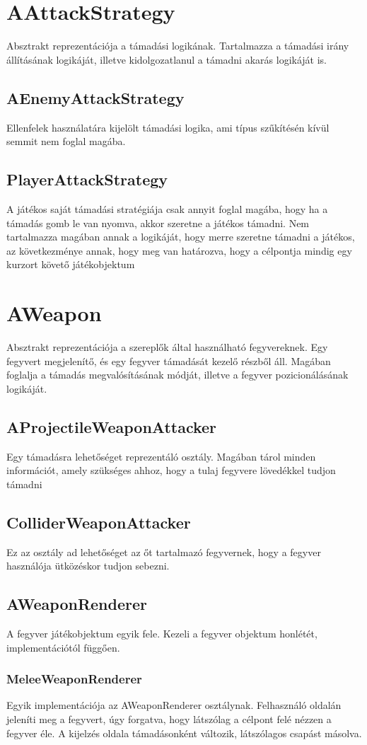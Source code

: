 \documentclass[
]{thesis-ekf}
\theoremstyle{definition}
\theoremstyle{remark}
\begin{document}
	\section{AAttackStrategy}
	Absztrakt reprezentációja a támadási logikának. Tartalmazza a támadási irány állításának logikáját, illetve kidolgozatlanul a támadni akarás logikáját is.
	\subsection{AEnemyAttackStrategy}
	Ellenfelek használatára kijelölt támadási logika, ami típus szűkítésén kívül semmit nem foglal magába.
	\subsection{PlayerAttackStrategy}
	A játékos saját támadási stratégiája csak annyit foglal magába, hogy ha a támadás gomb le van nyomva, akkor szeretne a játékos támadni. Nem tartalmazza magában annak a logikáját, hogy merre szeretne támadni a játékos, az következménye annak, hogy meg van határozva, hogy a célpontja mindig egy kurzort követő játékobjektum
	\section{AWeapon}
	Absztrakt reprezentációja a szereplők által használható fegyvereknek. Egy fegyvert megjelenítő, és egy fegyver támadását kezelő részből áll. Magában foglalja a támadás megvalósításának módját, illetve a fegyver pozicionálásának logikáját.
	\subsection{AProjectileWeaponAttacker}
	Egy támadásra lehetőséget reprezentáló osztály. Magában tárol minden információt, amely szükséges ahhoz, hogy a tulaj fegyvere lövedékkel tudjon támadni
	\subsection{ColliderWeaponAttacker}
	Ez az osztály ad lehetőséget az őt tartalmazó fegyvernek, hogy a fegyver használója ütközéskor tudjon sebezni.
	\subsection{AWeaponRenderer}
	A fegyver játékobjektum egyik fele. Kezeli a fegyver objektum honlétét, implementációtól függően.
	\subsubsection{MeleeWeaponRenderer}
	Egyik implementációja az AWeaponRenderer osztálynak. Felhasználó oldalán jeleníti meg a fegyvert, úgy forgatva, hogy látszólag a célpont felé nézzen a fegyver éle. A kijelzés oldala támadásonként változik, látszólagos csapást másolva.
\end{document}
